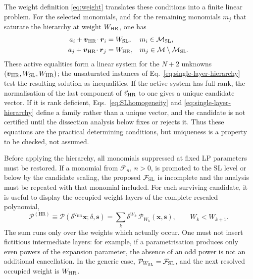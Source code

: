 \documentclass[a4paper,11pt]{article}
\newcommand{\x}{\boldsymbol{x}}
\newcommand{\s}{\boldsymbol{s}}
\newcommand{\HR}{\mathrm{HR}}
\newcommand{\FSL}{\mathcal F_{\rm SL}}
\newcommand{\MSL}{\mathcal M_{\rm SL}}
\newcommand{\WSL}{W_{\rm SL}}
\newcommand{\WHR}{W_{\rm HR}}
\newcommand{\vHR}{\vec v_{\rm HR}}
\begin{document}
The weight definition \eqref{eq:weight} translates these conditions into a
finite linear problem.  For the selected monomials, and for the remaining
monomials \(m_j\) that saturate the hierarchy at weight \(\WHR\), one has
\begin{subequations}
\label{eq:active-weight-system}
 \begin{align}
  a_i+\boldsymbol v_{\HR}\!\cdot\boldsymbol r_i&=\WSL,
  &&m_i\in\MSL,
\label{eq:active-SL-weight}\\
  a_j+\boldsymbol v_{\HR}\!\cdot\boldsymbol r_j&=\WHR,
  &&m_j\in\mathcal M\setminus\MSL.
\label{eq:active-HR-weight}
 \end{align}
\end{subequations}
These active equalities form a linear system for the \(N+2\) unknowns
\((\boldsymbol v_{\HR},\WSL,\WHR)\); the unsaturated instances of
Eq.~\eqref{eq:single-layer-hierarchy} test the resulting solution as
inequalities.  If the active system has full rank, the normalisation of the
last component of \(\vHR\) to one gives a unique candidate vector.  If it is
rank deficient, Eqs.~\eqref{eq:SLhomogeneity} and
\eqref{eq:single-layer-hierarchy} define a family rather than a unique
vector, and the candidate is not certified until the dissection analysis
below fixes or rejects it.  Thus these equations are the
practical determining conditions, but uniqueness is a property to be checked,
not assumed.

Before applying the hierarchy, all monomials suppressed at fixed LP
parameters must be restored.  If a monomial from \(\mathcal F_n\), \(n>0\),
is promoted to the SL level or below by the candidate scaling, the proposed
\(\FSL\) is incomplete and the analysis must be repeated with that monomial
included.  For each surviving candidate, it is useful to display the
occupied weight layers of the complete rescaled polynomial,
\begin{equation}
 \mathcal P^{(\HR)}
 \equiv \mathcal P(\delta^{\boldsymbol v_{\HR}}\x;\delta,\s)
 =
 \sum_k
 \delta^{W_k}\,\mathcal P_{W_k}(\x,\s),
 \qquad W_k<W_{k+1}.
\label{eq:weightlayers}
\end{equation}
The sum runs only over the weights which actually occur.  One must not insert
fictitious intermediate layers: for example, if a parametrisation produces
only even powers of the expansion parameter, the absence of an odd power is
not an additional cancellation.  In the generic case,
\(\mathcal P_{\WSL}=\FSL\), and the next resolved occupied weight is
\(\WHR\).
\end{document}
